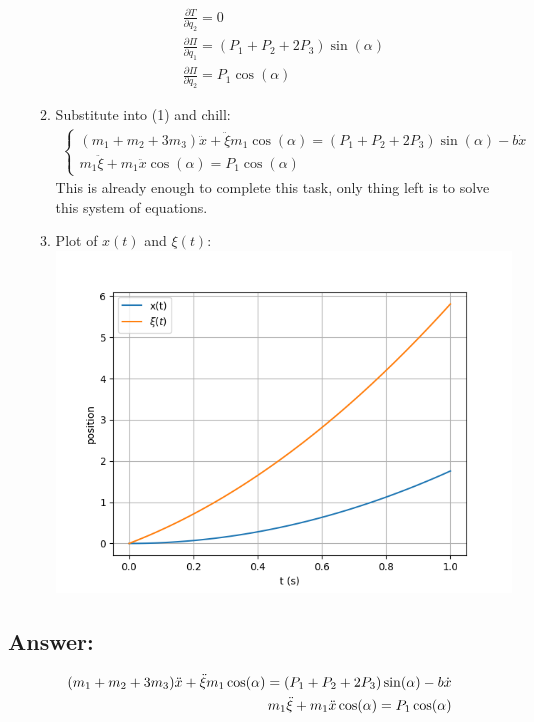 \begin{enumerate}
\begin{enumerate}
\begin{align}
                        \frac{\partial T}{\partial q_2} = 0                                                                             \\
                        \frac{\partial \Pi}{\partial q_1} = (P_1 + P_2 + 2 P_3) \sin(\alpha)                                            \\
                        \frac{\partial \Pi}{\partial q_2} = P_1 \cos(\alpha)
                    \end{align}
              \item Substitute into (1) and chill:
                    \begin{align}
                        \begin{cases}
                            (m_1 + m_2 + 3 m_3) \ddot{x} + \ddot{\xi} m_1 \cos(\alpha) = (P_1 + P_2 + 2 P_3) \sin(\alpha) - b \dot{x} \\
                            m_1 \ddot{\xi} + m_1 \ddot{x} \cos(\alpha) = P_1 \cos(\alpha)
                        \end{cases}
                    \end{align}
                    This is already enough to complete this task, only thing left is to solve this system of equations.
              \item Plot of $x(t)$ and $\xi(t)$: \\
                    \includegraphics[width=\linewidth]{xxi.png}
          \end{enumerate}
\end{enumerate}

\subsection*{Answer:}

\begin{answer}
    \begin{align}
            (m_1 + m_2 + 3 m_3) \ddot{x} + \ddot{\xi} m_1 \cos(\alpha) = (P_1 + P_2 + 2 P_3) \sin(\alpha) - b \dot{x} \notag \\
            m_1 \ddot{\xi} + m_1 \ddot{x} \cos(\alpha) = P_1 \cos(\alpha) \notag
    \end{align}
\end{answer}
